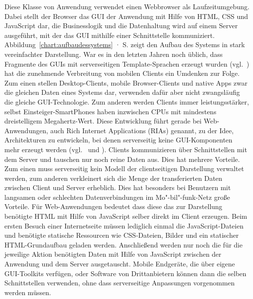 Diese Klasse von Anwendung verwendet einen Webbrowser als Laufzeitumgebung. Dabei stellt der Browser das GUI der Anwendung mit Hilfe von HTML, CSS und JavaScript dar, die Businesslogik und die Datenhaltung wird auf einem Server ausgeführt, mit der das GUI mithilfe einer Schnittstelle kommuniziert. Abbildung~\ref{chart:aufbaudessystems} · S.\pageref{chart:aufbaudessystems} zeigt den Aufbau des Systems in stark vereinfachter Darstellung. War es in den letzten Jahren noch üblich, dass Fragmente des GUIs mit serverseitigen Template-Sprachen erzeugt wurden (vgl.~\cite[S.48]{dunkel2008systemarchitekturen}) hat die zunehmende Verbreitung von mobilen Clients ein Umdenken zur Folge. Zum einen stellen Desktop-Clients, mobile Browser-Clients und native Apps zwar die gleichen Daten eines Systems dar, verwenden dafür aber nicht zwangsläufig die gleiche GUI-Technologie. Zum anderen werden Clients immer leistungsstärker, selbst Einsteiger-SmartPhones haben inzwischen CPUs mit mindestens dreistelligem Megahertz-Wert. Diese Entwicklung führt gerade bei Web-Anwendungen, auch Rich Internet Applications (RIAs) genannt, zu der Idee, Architekturen zu entwickeln, bei denen serverseitig keine GUI-Komponenten mehr erzeugt werden (vgl.~\cite{maccaw2011javascript} und \cite{coates2012phptemplating}). Clients kommunizieren über Schnittstellen mit dem Server und tauschen nur noch reine Daten aus. Dies hat mehrere Vorteile. Zum einen muss serverseitig kein Modell der clientseitigen Darstellung verwaltet werden, zum anderen verkleinert sich die Menge der transferierten Daten zwischen Client und Server erheblich. Dies hat besonders bei Benutzern mit langsamen oder schlechten Datenverbindungen im Mo"-bil"-funk-Netz große Vorteile. Für Web-Anwendungen bedeutet dass diese das zur Darstellung benötigte HTML mit Hilfe von JavaScript selber direkt im Client erzeugen. Beim ersten Besuch einer Internetseite müssen lediglich einmal die JavaScript-Dateien und benötigte statische Ressourcen wie CSS-Dateien, Bilder und ein statischer HTML-Grundaufbau geladen werden. Anschließend werden nur noch die für die jeweilige Aktion benötigten Daten mit Hilfe von JavaScript zwischen der Anwendung und dem Server ausgetauscht. Mobile Endgeräte, die über eigene GUI-Toolkits verfügen, oder Software von Drittanbietern können dann die selben Schnittstellen verwenden, ohne dass serverseitige Anpassungen vorgenommen werden müssen.

